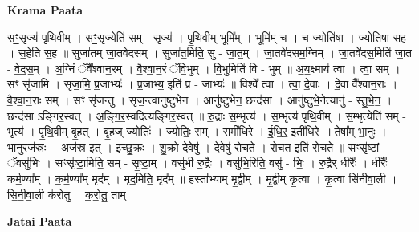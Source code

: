 \documentclass[17pt]{extarticle}
\begin{document}
\textbf{Krama Paata} \newline

सꣳ॒॒सृज्य॑ पृथि॒वीम् । सꣳ॒॒सृज्येति॑ सम् - सृज्य॑ । पृ॒थि॒वीम् भूमि᳚म् । भूमि॑म् च । च॒ ज्योति॑षा । ज्योति॑षा स॒ह । स॒हेति॑ स॒ह ॥ सुजा॑तम् जा॒तवे॑दसम् । सुजा॑त॒मिति॒ सु - जा॒त॒म् । जा॒तवे॑दसम॒ग्निम् । जा॒तवे॑दस॒मिति॑ जा॒त - वे॒द॒स॒म् । अ॒ग्निं ॅवै᳚श्वान॒रम् । वै॒श्वा॒न॒रं ॅवि॒भुम् । वि॒भुमिति॑ वि - भुम् ॥ अ॒य॒क्ष्माय॑ त्वा । त्वा॒ सम् । सꣳ सृ॑जामि । सृ॒जा॒मि॒ प्र॒जाभ्यः॑ । प्र॒जाभ्य॒ इति॑ प्र - जाभ्यः॑ ॥ विश्वे᳚ त्वा । त्वा॒ दे॒वाः । दे॒वा वै᳚श्वान॒राः । वै॒श्वा॒न॒राः सम् । सꣳ सृ॑जन्तु । सृ॒ज॒न्त्वानु॑ष्टुभेन । आनु॑ष्टुभेन॒ छन्द॑सा । आनु॑ष्टुभे॒नेत्यानु॑ - स्तु॒भे॒न॒ । छन्द॑सा ऽङ्गिर॒स्वत् । अ॒ङ्गि॒र॒स्वदित्य॑ङ्गिर॒स्वत् ॥ रु॒द्राः स॒म्भृत्य॑ । स॒म्भृत्य॑ पृथि॒वीम् । स॒म्भृत्येति॑ सम् - भृत्य॑ । पृ॒थि॒वीम् बृ॒हत् । बृ॒हज् ज्योतिः॑ । ज्योतिः॒ सम् । समी॑धिरे । ई॒धि॒र॒ इती॑धिरे ॥ तेषा᳚म् भा॒नुः । भा॒नुरज॑स्रः । अज॑स्र॒ इत् । इच्छु॒क्रः । शु॒क्रो दे॒वेषु॑ । दे॒वेषु॑ रोचते । रो॒च॒त॒ इति॑ रोचते ॥ सꣳसृ॑ष्टां॒ ॅवसु॑भिः । सꣳसृ॑ष्टा॒मिति॒ सम् - सृ॒ष्टा॒म् । वसु॑भी रु॒द्रैः । वसु॑भि॒रिति॒ वसु॑ - भिः॒ । रु॒द्रैर् धीरैः᳚ । धीरैः᳚ कर्म॒ण्या᳚म् । क॒र्म॒ण्या᳚म् मृद᳚म् । मृद॒मिति॒ मृद᳚म् ॥ हस्ता᳚भ्याम् मृ॒द्वीम् । मृ॒द्वीम् कृ॒त्वा । कृ॒त्वा सि॑नीवा॒ली । सि॒नी॒वा॒ली क॑रोतु । क॒रो॒तु॒ ताम् \newline

\textbf{Jatai Paata} \newline
\end{document}
